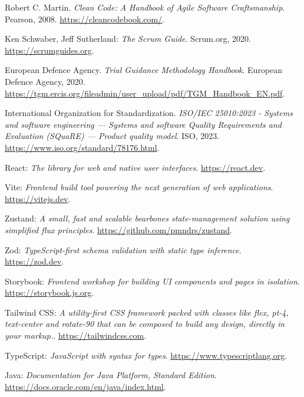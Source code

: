 \begin{thebibliography}{99}

    Robert C. Martin. \emph{Clean Code: A Handbook of Agile Software Craftsmanship}. Pearson, 2008. \url{https://cleancodebook.com/}.

    Ken Schwaber, Jeff Sutherland: \emph{The Scrum Guide}. Scrum.org, 2020. \url{https://scrumguides.org}.

    European Defence Agency. \emph{Trial Guidance Methodology Handbook}. European Defence Agency, 2020. \url{https://tgm.ercis.org/fileadmin/user_upload/pdf/TGM_Handbook_EN.pdf}.

    International Organization for Standardization. \emph{ISO/IEC 25010:2023 - Systems and software engineering — Systems and software Quality Requirements and Evaluation (SQuaRE) — Product quality model}. ISO, 2023. \url{https://www.iso.org/standard/78176.html}.

    React: \emph{The library for web and native user interfaces}. \url{https://react.dev}.

    Vite: \emph{Frontend build tool powering the next generation of web applications}. \newline \url{https://vitejs.dev}.

    Zustand: \emph{A small, fast and scalable bearbones state-management solution using simplified flux principles}. \url{https://github.com/pmndrs/zustand}.

    Zod: \emph{TypeScript-first schema validation with static type inference}. \url{https://zod.dev}.

    Storybook: \emph{Frontend workshop for building UI components and pages in isolation}. \newline \url{https://storybook.js.org}.

    Tailwind CSS: \emph{A utility-first CSS framework packed with classes like flex, pt-4, text-center and rotate-90 that can be composed to build any design, directly in your markup.}. \newline \url{https://tailwindcss.com}.

    TypeScript: \emph{JavaScript with syntax for types}. \url{https://www.typescriptlang.org}.

    Java: \emph{Documentation for Java Platform, Standard Edition}. \url{https://docs.oracle.com/en/java/index.html}.


\end{thebibliography}
